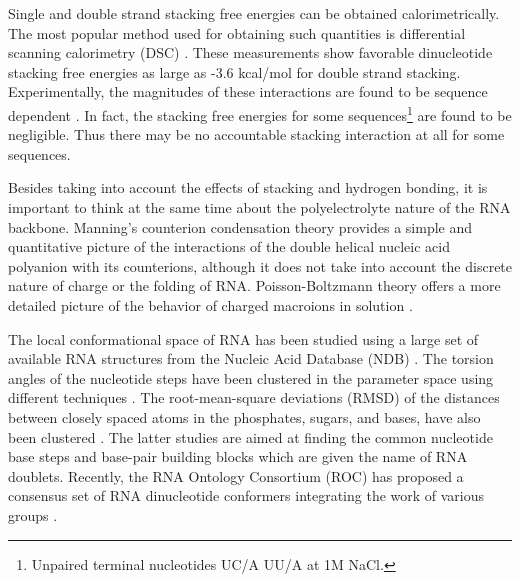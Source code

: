 Single and double strand stacking free energies can be obtained
calorimetrically. The most popular method used for obtaining such
quantities is differential scanning calorimetry (DSC)
\cite{marky1982}. These measurements show favorable dinucleotide
stacking free energies as large as -3.6 kcal/mol for double strand
stacking. Experimentally, the magnitudes of these interactions are
found to be sequence dependent \cite{bloomfield2000}. In fact, the
stacking free energies for some sequences\footnote{Unpaired terminal
 nucleotides UC/A  UU/A  at 1M NaCl.} are found to be negligible. Thus
there may be no accountable stacking interaction at all for some sequences.

Besides taking into account the effects of stacking and hydrogen
bonding, it is important to think at the same time about the
polyelectrolyte nature of the RNA backbone. Manning's counterion
condensation theory \cite{manning1977, manning2003} provides a
simple and quantitative picture of the interactions of the double
helical nucleic acid polyanion with its counterions, although it
does not take into account the discrete nature of charge
\cite{bloomfield2000} or the folding of RNA. Poisson-Boltzmann
theory offers a more detailed picture of the behavior of charged
macroions in solution \cite{antypov2005}.

The local conformational space of RNA has been studied using a large
set of available RNA structures from the Nucleic Acid Database
(NDB) \cite{berman1992}. The torsion angles of the nucleotide steps have been
clustered in the parameter space using different techniques
\cite{murray2003, schneider2004}. The root-mean-square deviations
(RMSD) of the distances between closely spaced atoms in the
phosphates, sugars, and bases, have also been clustered
\cite{sykes2005}. The latter studies are aimed at finding the common
nucleotide base steps and base-pair building blocks which are given
the name of RNA doublets. Recently, the RNA Ontology Consortium (ROC) has
proposed a consensus set of RNA dinucleotide conformers integrating
the work of various groups \cite{richardson2008}.


